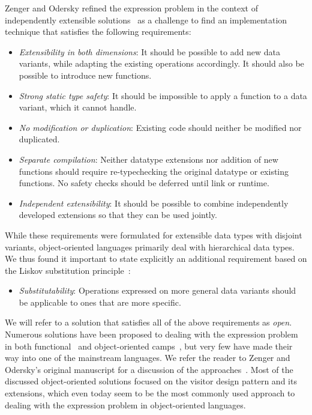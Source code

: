 Zenger and Odersky refined the expression problem in the context of 
independently extensible solutions~\cite{fool12} as a challenge to find an 
implementation technique that satisfies the following requirements:
%
\begin{itemize}
\setlength{\itemsep}{0pt}
\setlength{\parskip}{0pt}
\item \emph{Extensibility in both dimensions}: It should be possible to add new 
      data variants, while adapting the existing operations accordingly. It 
      should also be possible to introduce new functions. 
\item \emph{Strong static type safety}: It should be impossible to apply a 
      function to a data variant, which it cannot handle. 
\item \emph{No modification or duplication}: Existing code should neither be 
      modified nor duplicated.
\item \emph{Separate compilation}: Neither datatype extensions nor addition of 
      new functions should require re-typechecking the original datatype or 
      existing functions. No safety checks should be deferred until link or 
      runtime.
\item \emph{Independent extensibility}: It should be possible to combine 
      independently developed extensions so that they can be used jointly.
\end{itemize}
%
While these requirements were formulated for extensible data types with 
disjoint variants, object-oriented languages primarily deal with 
hierarchical data types. We thus found it important to state explicitly an 
additional requirement based on the Liskov substitution principle~\cite{Lis87}:
%
\begin{itemize}
\setlength{\itemsep}{0pt}
\setlength{\parskip}{0pt}
\item \emph{Substitutability}: Operations expressed on more general data variants
      should be applicable to ones that are more specific.
\end{itemize}


\noindent
We will refer to a solution that satisfies all of the above requirements as \emph{open}. 
Numerous solutions have been proposed to dealing with the expression problem in both 
functional~\cite{garrigue-98,LohHinze2006} and object-oriented 
camps~\cite{Palsberg98,Krishnamurthi98,Zenger:2001,runabout}, but very few have 
made their way into one of the mainstream languages. We refer the reader to Zenger 
and Odersky's original manuscript for a discussion of the approaches~\cite{fool12}.
Most of the discussed object-oriented solutions focused on the visitor design pattern and its extensions, 
which even today seem to be the most commonly used approach to dealing with the 
expression problem in object-oriented languages.

